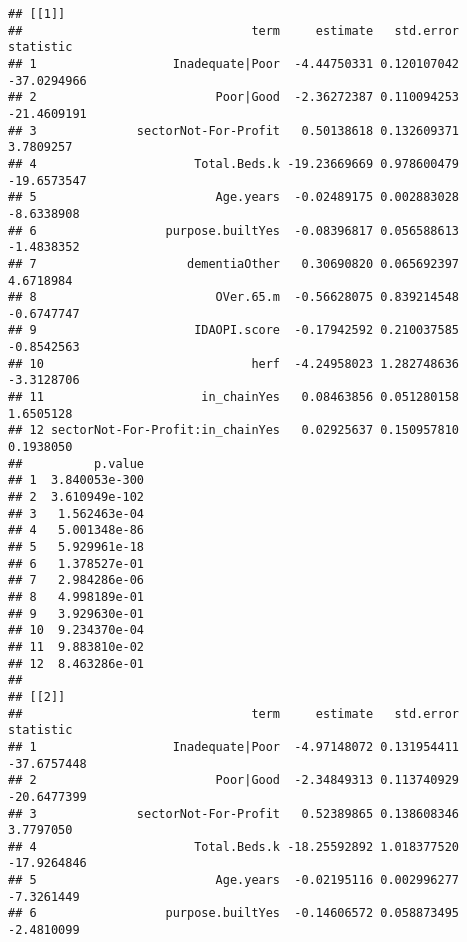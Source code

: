 \documentclass[]{article}
\newenvironment{Shaded}{\begin{snugshade}}{\end{snugshade}}
\newcommand{\KeywordTok}[1]{\textcolor[rgb]{0.13,0.29,0.53}{\textbf{{#1}}}}
\newcommand{\DataTypeTok}[1]{\textcolor[rgb]{0.13,0.29,0.53}{{#1}}}
\newcommand{\StringTok}[1]{\textcolor[rgb]{0.31,0.60,0.02}{{#1}}}
\newcommand{\OtherTok}[1]{\textcolor[rgb]{0.56,0.35,0.01}{{#1}}}
\newcommand{\NormalTok}[1]{{#1}}
\begin{document}
\begin{Shaded}
\end{Shaded}

\begin{verbatim}
## [[1]]
##                                term     estimate   std.error   statistic
## 1                   Inadequate|Poor  -4.44750331 0.120107042 -37.0294966
## 2                         Poor|Good  -2.36272387 0.110094253 -21.4609191
## 3              sectorNot-For-Profit   0.50138618 0.132609371   3.7809257
## 4                      Total.Beds.k -19.23669669 0.978600479 -19.6573547
## 5                         Age.years  -0.02489175 0.002883028  -8.6338908
## 6                  purpose.builtYes  -0.08396817 0.056588613  -1.4838352
## 7                     dementiaOther   0.30690820 0.065692397   4.6718984
## 8                         OVer.65.m  -0.56628075 0.839214548  -0.6747747
## 9                      IDAOPI.score  -0.17942592 0.210037585  -0.8542563
## 10                             herf  -4.24958023 1.282748636  -3.3128706
## 11                      in_chainYes   0.08463856 0.051280158   1.6505128
## 12 sectorNot-For-Profit:in_chainYes   0.02925637 0.150957810   0.1938050
##          p.value
## 1  3.840053e-300
## 2  3.610949e-102
## 3   1.562463e-04
## 4   5.001348e-86
## 5   5.929961e-18
## 6   1.378527e-01
## 7   2.984286e-06
## 8   4.998189e-01
## 9   3.929630e-01
## 10  9.234370e-04
## 11  9.883810e-02
## 12  8.463286e-01
## 
## [[2]]
##                                term     estimate   std.error   statistic
## 1                   Inadequate|Poor  -4.97148072 0.131954411 -37.6757448
## 2                         Poor|Good  -2.34849313 0.113740929 -20.6477399
## 3              sectorNot-For-Profit   0.52389865 0.138608346   3.7797050
## 4                      Total.Beds.k -18.25592892 1.018377520 -17.9264846
## 5                         Age.years  -0.02195116 0.002996277  -7.3261449
## 6                  purpose.builtYes  -0.14606572 0.058873495  -2.4810099

\end{verbatim}
\end{document}
